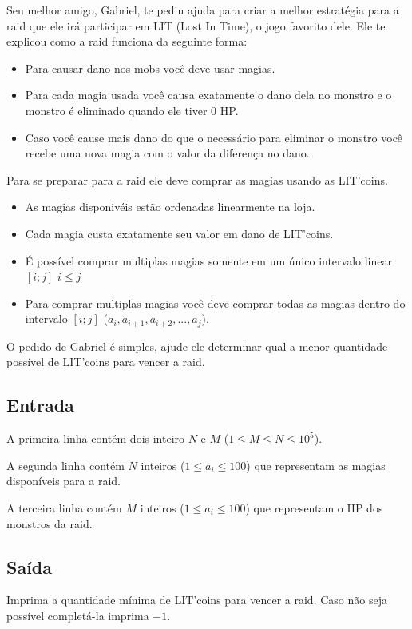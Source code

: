 Seu melhor amigo, Gabriel, te pediu ajuda para criar a melhor estratégia para a raid que ele irá participar em LIT (Lost In Time), o jogo favorito dele. Ele te explicou como a raid funciona da seguinte forma:

\begin{itemize}
    \item Para causar dano nos mobs você deve usar magias.
    \item Para cada magia usada você causa exatamente o dano dela no monstro e o monstro é eliminado quando ele tiver 0 HP.
    \item Caso você cause mais dano do que o necessário para eliminar o monstro você recebe uma nova magia com o valor da diferença no dano.
\end{itemize}

Para se preparar para a raid ele deve comprar as magias usando as LIT'coins.
\begin{itemize}
    \item As magias disponivéis estão ordenadas linearmente na loja.
    \item Cada magia custa exatamente seu valor em dano de LIT'coins.
    \item É possível comprar multiplas magias somente em um único intervalo linear $[i; j]$ $i \leq j$
    \item Para comprar multiplas magias você deve comprar todas as magias dentro do intervalo $[i; j]$ ($a_i, a_{i+1}, a_{i+2}, ..., a_j$).
\end{itemize}

O pedido de Gabriel é simples, ajude ele determinar qual a menor quantidade possível de LIT'coins para vencer a raid.

\subsection*{Entrada}
A primeira linha contém dois inteiro $N$ e $M$ ($1 \leq M \leq N \leq 10^5$).

A segunda linha contém $N$ inteiros ($1 \leq a_i \leq 100$) que representam as magias disponíveis para a raid.

A terceira linha contém $M$ inteiros ($1 \leq a_i \leq 100$) que representam o HP dos monstros da raid.


\subsection*{Saída}
Imprima a quantidade mínima de LIT'coins para vencer a raid. Caso não seja possível completá-la imprima $-1$.
